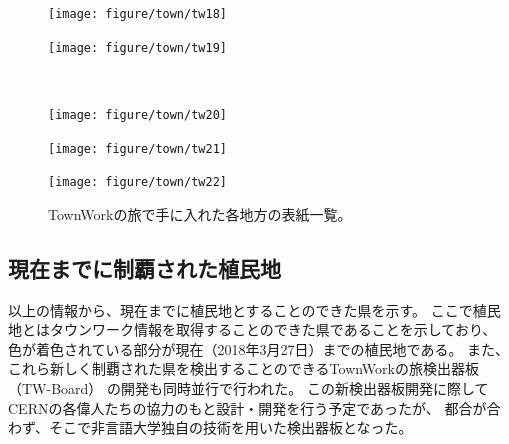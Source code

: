 \documentclass[12pt]{jsarticle}
\begin{document}
\newpage
\begin{figure}[htbp]
\vspace{-10mm}
    \centering
  \begin{minipage}{0.4\linewidth}
    \centering
    \texttt{[image: figure/town/tw18]}
  \end{minipage}
  \begin{minipage}{0.4\linewidth}
    \centering
    \texttt{[image: figure/town/tw19]}
  \end{minipage}\\
  \begin{minipage}{0.4\linewidth}
    \centering
    \texttt{[image: figure/town/tw20]}
  \end{minipage}
  \begin{minipage}{0.4\linewidth}
    \centering
    \texttt{[image: figure/town/tw21]}
  \end{minipage}
  \begin{minipage}{0.4\linewidth}
    \centering
    \texttt{[image: figure/town/tw22]}
  \end{minipage}
  \caption{TownWorkの旅で手に入れた各地方の表紙一覧。}
  \label{CscDetaDphi-CSide}
\end{figure}

\newpage
\clearpage
\subsection{現在までに制覇された植民地}
以上の情報から、現在までに植民地とすることのできた県を示す。
ここで植民地とはタウンワーク情報を取得することのできた県であることを示しており、
色が着色されている部分が現在（2018年3月27日）までの植民地である。
また、これら新しく制覇された県を検出することのできるTownWorkの旅検出器板（TW-Board）
の開発も同時並行で行われた。
この新検出器板開発に際してCERNの各偉人たちの協力のもと設計・開発を行う予定であったが、
都合が合わず、そこで非言語大学独自の技術を用いた検出器板となった。
\end{document}
